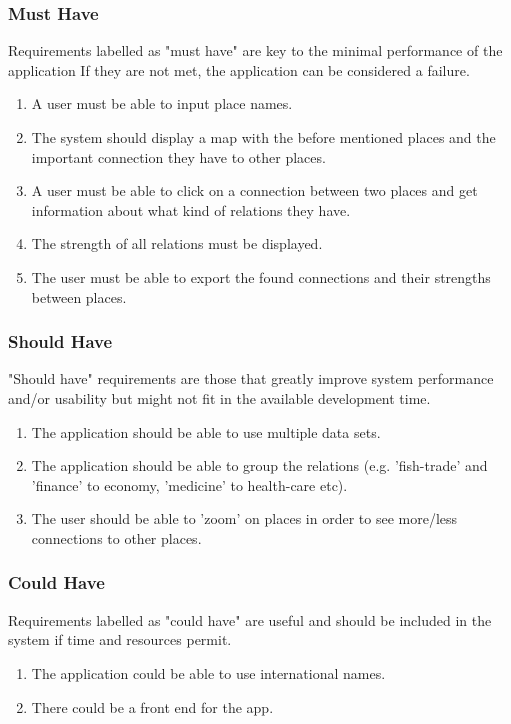 \subsubsection {Must Have}
Requirements labelled as "must have" are key to the minimal performance of the application If they are not met, the application can be considered a failure.

\begin{enumerate}
    \item A user must be able to input place names.
    \item The system should display a map with the before mentioned places and the important connection they have to other places.
    \item A user must be able to click on a connection between two places and get information about what kind of relations they have.
    \item The strength of all relations must be displayed.
    \item The user must be able to export the found connections and their strengths between places.
\end{enumerate}
 
\subsubsection {Should Have}
"Should have" requirements are those that greatly improve system performance and/or usability but might not fit in the available development time.

\begin{enumerate}
    \item The application should be able to use multiple data sets.
    \item The application should be able to group the relations (e.g. 'fish-trade' and 'finance' to economy, 'medicine' to health-care etc).
    \item The user should be able to 'zoom' on places in order to see more/less connections to other places.
\end{enumerate}

\subsubsection {Could Have}
Requirements labelled as "could have" are useful and should be included in the system if time and resources permit.

\begin{enumerate}
    \item The application could be able to use international names.
    \item There could be a front end for the app.
\end{enumerate}

